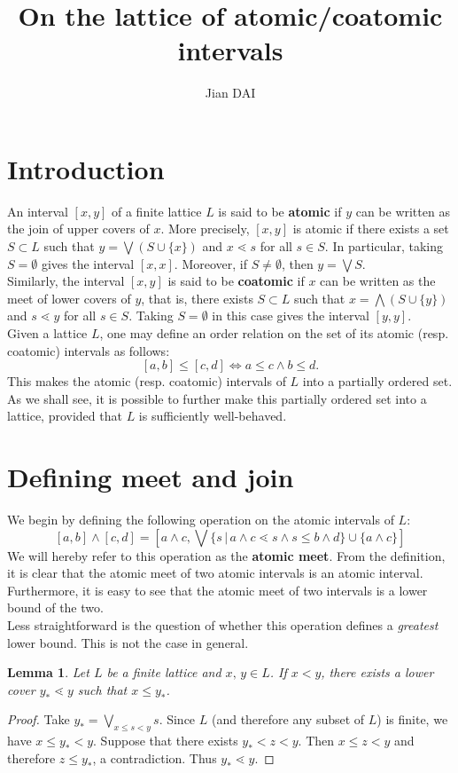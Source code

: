 \documentclass{article}
\title{On the lattice of atomic/coatomic intervals}
\author{Jian DAI}
\newtheorem{lemma}[theorem]{Lemma}
\begin{document}
\maketitle

\section{Introduction}

An interval $[x, y]$ of a finite lattice $L$ is said to be \textbf{atomic} if $y$ can be written as the join of upper covers of $x$. More precisely, $[x, y]$ is atomic if there exists a set $S \subset L$ such that $y = \bigvee (S \cup \{x\})$ and $x \lessdot s$ for all $s \in S$. In particular, taking $S = \emptyset$ gives the interval $[x, x]$. Moreover, if $S \ne \emptyset$, then $y = \bigvee S$. \\
Similarly, the interval $[x, y]$ is said to be \textbf{coatomic} if $x$ can be written as the meet of lower covers of $y$, that is, there exists $S \subset L$ such that $x = \bigwedge (S \cup \{y\})$ and $s \lessdot y$ for all $s \in S$. Taking $S = \emptyset$ in this case gives the interval $[y, y]$. \\
Given a lattice $L$, one may define an order relation on the set of its atomic (resp. coatomic) intervals as follows:
$$[a,b] \le [c,d] \iff a \le c \wedge b \le d.$$
This makes the atomic (resp. coatomic) intervals of $L$ into a partially ordered set. As we shall see, it is possible to further make this partially ordered set into a lattice, provided that $L$ is sufficiently well-behaved.

\section{Defining meet and join}

We begin by defining the following operation on the atomic intervals of $L$:
$$[a, b] \wedge [c, d] =  [a \wedge c, \bigvee \{s \,|\, a \wedge c \lessdot s \wedge s \le b \wedge d \} \cup \{a \wedge c\}]$$
We will hereby refer to this operation as the \textbf{atomic meet}. From the definition, it is clear that the atomic meet of two atomic intervals is an atomic interval. Furthermore, it is easy to see that the atomic meet of two intervals is a lower bound of the two. \\
Less straightforward is the question of whether this operation defines a \textit{greatest} lower bound. This is not the case in general.

\begin{lemma} Let $L$ be a finite lattice and $x,\, y \in L$. If $x < y$, there exists a lower cover $y_* \lessdot y$ such that $x \le y_*$.
\end{lemma}
\begin{proof}
    Take $y_* = \bigvee_{x \le s < y} s$. Since $L$ (and therefore any subset of $L$) is finite, we have $x \le y_* < y$. Suppose that there exists $y_* < z < y$. Then $x \le z < y$ and therefore $z \le y_*$, a contradiction. Thus $y_* \lessdot y$.
\end{proof}
\end{document}
